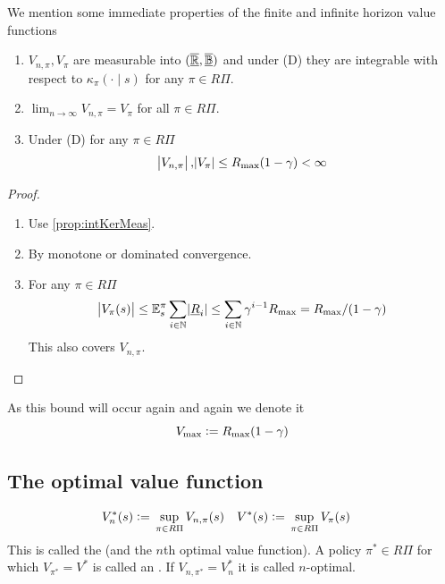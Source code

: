 We mention some immediate properties of the finite and infinite horizon
value functions
\begin{prop}
  \leavevmode
  \begin{enumerate}
    \item $V_{n,\pi}, V_\pi$ are measurable
      into $(\underline{\overline{\mathbb{R}}}, \underline{\overline{\mathbb{B}}})$
      and under (D) they are integrable with respect to $\kappa_\pi(\cdot \mid s)$
      for any $\pi \in R\Pi$.
    \item $\lim_{n\to\infty} V_{n, \pi} = V_\pi $
      for all $\pi \in R\Pi$.
    \item Under (D) for any $\pi \in R\Pi$
      \[\abs{V_{n,\pi}}, \abs{V_\pi} \leq R_{\max} (1 - \gamma) < \infty\]
  \end{enumerate}
  \label{prop:VpiMeas}
\end{prop}
\begin{proof}  
  \leavevmode
  \begin{enumerate}
    \item Use \cref{prop:intKerMeas}.
    \item By monotone or dominated convergence.
    \item For any $\pi \in R\Pi$
      \[ \abs{V_\pi(s)} \leq \mathbb{E}_s^\pi \sum_{i \in \mathbb{N}} \abs{\underline{R}_i}
	\leq \sum_{i \in \mathbb{N}} \gamma^{i-1} R_{\max}
      = R_{\max} / (1-\gamma) \]
      This also covers $V_{n, \pi}$.
  \end{enumerate}
\end{proof}

\begin{rem}
  As this bound will occur again and again we denote it
  \begin{equation}
    V_{\max} \vcentcolon= R_{\max}(1-\gamma)
    \label{eq:VmaxDef}
  \end{equation}
\end{rem}

\subsection{The optimal value function}

\begin{defn} 
  \begin{align*}
    V_n^*(s) \vcentcolon= & \; \sup_{\pi \in R\Pi} V_{n,\pi}(s) &
    V^*(s) \vcentcolon= & \; \sup_{\pi \in R\Pi} V_\pi(s)
  \end{align*}
  This is called the  (and the $n$th
  optimal value function).
  A policy $\pi^* \in R\Pi$ for which $V_{\pi^*} = V^*$ is called an
  .
  If $V_{n, \pi^*} = V^*_n$ it is called $n$-optimal.
  \label{defn:optimalValue}
\end{defn}

